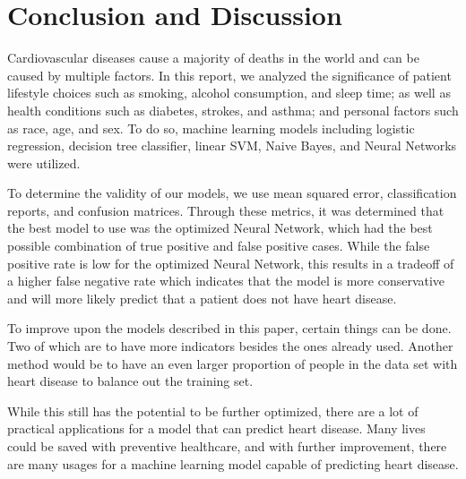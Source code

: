 \documentclass[a4paper]{article}
\begin{document}
\section*{Conclusion and Discussion}

Cardiovascular diseases cause a majority of deaths in the world and can be caused by multiple factors. In this report, we analyzed the significance of patient lifestyle choices such as smoking, alcohol consumption, and sleep time; as well as health conditions such as diabetes, strokes, and asthma; and personal factors such as race, age, and sex. To do so, machine learning models including logistic regression, decision tree classifier, linear SVM, Naive Bayes, and Neural Networks were utilized.

To determine the validity of our models, we use mean squared error, classification reports, and confusion matrices. Through these metrics, it was determined that the best model to use was the optimized Neural Network, which had the best possible combination of true positive and false positive cases. While the false positive rate is low for the optimized Neural Network, this results in a tradeoff of a higher false negative rate which indicates that the model is more conservative and will more likely predict that a patient does not have heart disease.

To improve upon the models described in this paper, certain things can be done. Two of which are to have more indicators besides the ones already used. Another method would be to have an even larger proportion of people in the data set with heart disease to balance out the training set.

While this still has the potential to be further optimized, there are a lot of practical applications for a model that can predict heart disease. Many lives could be saved with preventive healthcare, and with further improvement, there are many usages for a machine learning model capable of predicting heart disease.
\end{document}
